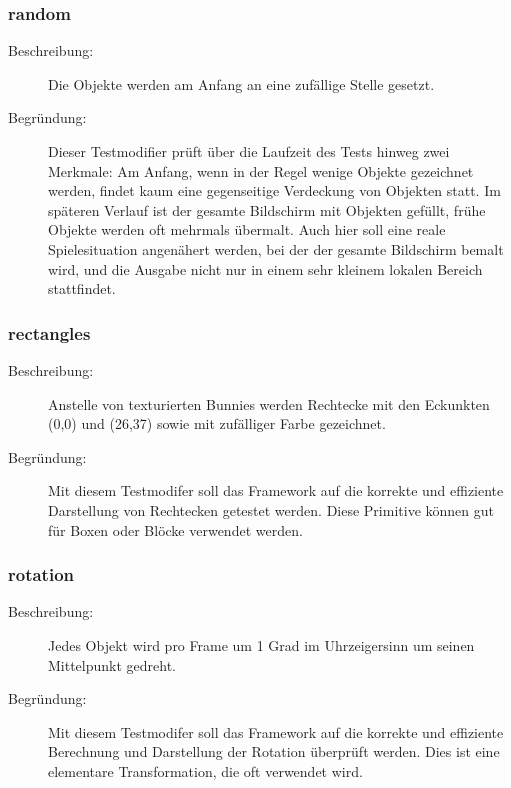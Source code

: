\subsubsection{random} 
\begin{description}
\item[Beschreibung:] Die Objekte werden am Anfang an eine zufällige Stelle gesetzt. \\
\item[Begründung:] Dieser Testmodifier prüft über die Laufzeit des Tests hinweg zwei Merkmale: Am Anfang, wenn in der Regel wenige Objekte gezeichnet werden, findet kaum eine gegenseitige Verdeckung von Objekten statt. Im späteren Verlauf ist der gesamte Bildschirm mit Objekten gefüllt, frühe Objekte werden oft mehrmals übermalt. Auch hier soll eine reale Spielesituation angenähert werden, bei der der gesamte Bildschirm bemalt wird, und die Ausgabe nicht nur in einem sehr kleinem lokalen Bereich stattfindet.
\end{description}

\subsubsection{rectangles}
\begin{description}
\item[Beschreibung:] Anstelle von texturierten Bunnies werden Rechtecke mit den Eckunkten (0,0) und (26,37) sowie mit zufälliger Farbe gezeichnet. \\
\item[Begründung:] Mit diesem Testmodifer soll das Framework auf die korrekte und effiziente Darstellung von Rechtecken getestet werden. Diese Primitive können gut für Boxen oder Blöcke verwendet werden.
\end{description}

\subsubsection{rotation}
\begin{description}
\item[Beschreibung:] Jedes Objekt wird pro Frame um 1 Grad im Uhrzeigersinn um seinen Mittelpunkt gedreht. \\
\item[Begründung:] Mit diesem Testmodifer soll das Framework auf die korrekte und effiziente Berechnung und Darstellung der Rotation überprüft werden. Dies ist eine elementare Transformation, die oft verwendet wird.
\end{description}

